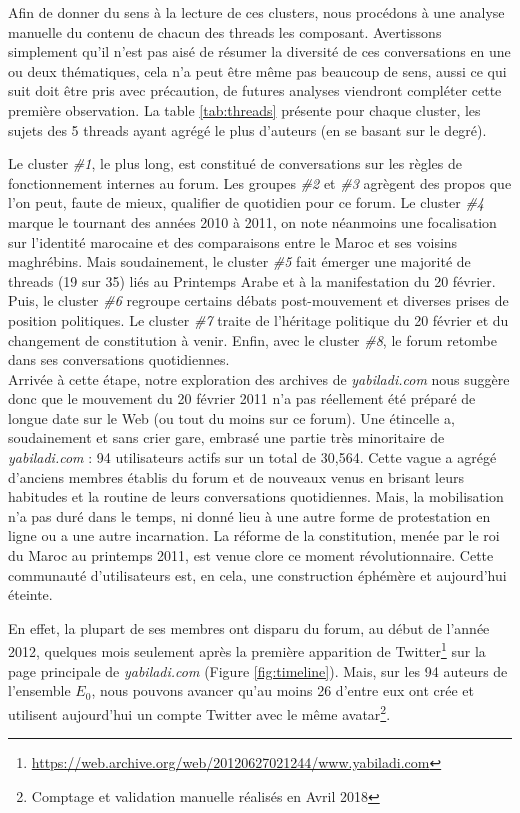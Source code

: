 \documentclass[symmetric,justified,marginals=raggedouter]{tufte-book}
\begin{document}
Afin de donner du sens à la lecture de ces clusters, nous procédons à une analyse manuelle du contenu de chacun des threads les composant. Avertissons simplement qu'il n'est pas aisé de résumer la diversité de ces conversations en une ou deux thématiques, cela n'a peut être même pas beaucoup de sens, aussi ce qui suit doit être pris avec précaution, de futures analyses viendront compléter cette première observation. La table \ref{tab:threads} présente pour chaque cluster, les sujets des 5 threads ayant agrégé le plus d'auteurs (en se basant sur le degré).

Le cluster \textit{\#1}, le plus long, est constitué de conversations sur les règles de fonctionnement internes au forum. Les groupes \textit{\#2} et \textit{\#3} agrègent des propos que l'on peut, faute de mieux, qualifier de quotidien pour ce forum. Le cluster \textit{\#4} marque le tournant des années 2010 à 2011, on note néanmoins une focalisation sur l'identité marocaine et des comparaisons entre le Maroc et ses voisins maghrébins. Mais soudainement, le cluster \textit{\#5} fait émerger une majorité de threads (19 sur 35) liés au Printemps Arabe et à la manifestation du 20 février. Puis, le cluster \textit{\#6} regroupe certains débats post-mouvement et diverses prises de position politiques. Le cluster \textit{\#7} traite de l'héritage politique du 20 février et du changement de constitution à venir. Enfin, avec le cluster \textit{\#8}, le forum retombe dans ses conversations quotidiennes.\\ 

\noindent Arrivée à cette étape, notre exploration des archives de \textit{yabiladi.com} nous suggère donc que le mouvement du 20 février 2011 n'a pas réellement été préparé de longue date sur le Web (ou tout du moins sur ce forum). Une étincelle a, soudainement et sans crier gare, embrasé une partie très minoritaire de \textit{yabiladi.com} : 94 utilisateurs actifs sur un total de 30,564. Cette vague a agrégé d'anciens membres établis du forum et de nouveaux venus en brisant leurs habitudes et la routine de leurs conversations quotidiennes. Mais, la mobilisation n'a pas duré dans le temps, ni donné lieu à une autre forme de protestation en ligne ou a une autre incarnation. La réforme de la constitution, menée par le roi du Maroc au printemps 2011, est venue clore ce moment révolutionnaire. Cette communauté d'utilisateurs est, en cela, une construction éphémère et aujourd'hui éteinte. 

En effet, la plupart de ses membres ont disparu du forum, au début de l'année 2012, quelques mois seulement après la première apparition de Twitter\footnote{\url{https://web.archive.org/web/20120627021244/www.yabiladi.com}} sur la page principale de \textit{yabiladi.com} (Figure \ref{fig:timeline}). Mais, sur les 94 auteurs de l'ensemble $E_0$, nous pouvons avancer qu'au moins 26 d'entre eux ont crée et utilisent aujourd'hui un compte Twitter avec le même avatar\footnote{Comptage et validation manuelle réalisés en Avril 2018}.
\end{document}
